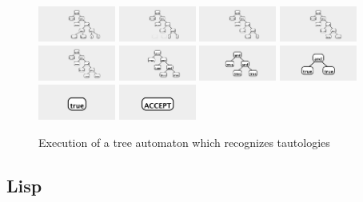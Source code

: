 \documentclass{article}
\begin{document}
\begin{figure}
\begin{center}
\includegraphics[width=1in]{../board/pics/ss1351.png}
\includegraphics[width=1in]{../board/pics/ss1401.png}
\includegraphics[width=1in]{../board/pics/ss1451.png}
\includegraphics[width=1in]{../board/pics/ss1501.png}
\includegraphics[width=1in]{../board/pics/ss1551.png}
\includegraphics[width=1in]{../board/pics/ss1601.png}
\includegraphics[width=1in]{../board/pics/ss1651.png}
\includegraphics[width=1in]{../board/pics/ss1701.png}
\includegraphics[width=1in]{../board/pics/ss1751.png}
\includegraphics[width=1in]{../board/pics/ss1801.png}
\end{center}
\caption{Execution of a tree automaton which recognizes tautologies}
\end{figure}


\subsection{Lisp}
\end{document}

